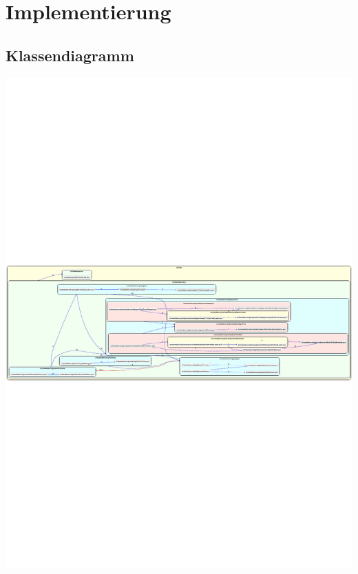 \section{Implementierung}

\subsection{Klassendiagramm}
\begin{minipage}[b]{0.5\linewidth}
\centering
\includegraphics[width=\textheight, angle=90]{img/ArchInternalDependencies-ch}
\end{minipage}
\hspace{0.5cm}
